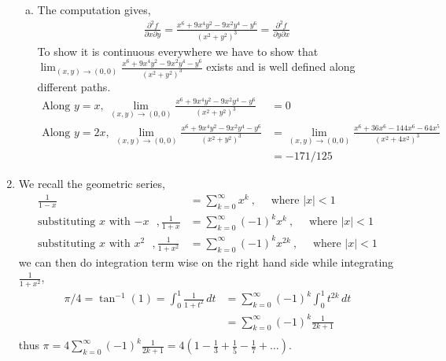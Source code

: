 \documentclass[a4paper,12pt]{article}
\theoremstyle{definition}
\begin{document}
\begin{enumerate}
\begin{enumerate}[(a)]
\item The computation gives,
\begin{align*}
\frac{\partial^2f}{\partial x \partial y} = \frac{x^6+9x^4y^2-9x^2y^4-y^6}{(x^2+y^2)^3} = \frac{\partial^2f}{\partial y \partial x}
\end{align*}
To show it is continuous everywhere we have to show that $\lim_{(x,y)\to(0,0)}\frac{x^6+9x^4y^2-9x^2y^4-y^6}{(x^2+y^2)^3}$ exists and is well defined along different paths.
\begin{align*}
\text{Along $y=x$, }\lim_{(x,y)\to(0,0)}\frac{x^6+9x^4y^2-9x^2y^4-y^6}{(x^2+y^2)^3} &= 0\\
\text{Along $y=2x$, } \lim_{(x,y)\to(0,0)}\frac{x^6+9x^4y^2-9x^2y^4-y^6}{(x^2+y^2)^3}&= \lim_{(x,y)\to(0,0)}\frac{x^6+36x^6-144x^6-64x^5}{(x^2+4x^2)^3} \\
&=-171/125
\end{align*}
\end{enumerate}

\item We recall the geometric series,
\begin{align*}
\frac{1}{1-x} &= \sum_{k=0}^{\infty}x^k~, \quad\text{ where $|x|<1$}\\
\text{substituting $x$ with $-x$ }, \frac{1}{1+x} &= \sum_{k=0}^{\infty}(-1)^kx^k~, \quad\text{ where $|x|<1$}\\
\text{substituting $x$ with $x^2$ }, \frac{1}{1+x^2} &= \sum_{k=0}^{\infty}(-1)^kx^{2k}~, \quad\text{ where $|x|<1$}
\end{align*}
we can then do integration term wise on the right hand side while integrating $\frac{1}{1+x^2}$,
\begin{align*}
\pi/4=\tan^{-1}(1) = \int_{0}^{1}\frac{1}{1+t^2}\,dt &= \sum_{k=0}^{\infty}(-1)^k\int_{0}^{1}t^{2k}\,dt\\
&= \sum_{k=0}^{\infty}(-1)^k\frac{1}{2k+1}\\
\end{align*}
thus $\pi = 4\sum_{k=0}^{\infty}(-1)^k\frac{1}{2k+1} = 4\left(1-\frac{1}{3}+\frac{1}{5}-\frac{1}{7}+\ldots\right)$.



\end{enumerate}
\end{document}
